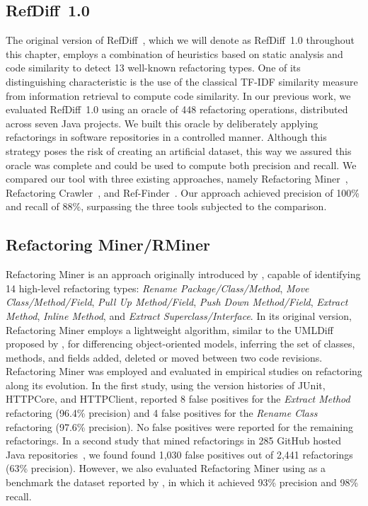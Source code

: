 \subsection{RefDiff~1.0}

The original version of RefDiff~\citep{msr2017}, which we will denote as RefDiff~1.0 throughout this chapter, employs a combination of heuristics based on static analysis and code similarity to detect 13 well-known refactoring types.
One of its distinguishing characteristic is the use of the classical TF-IDF similarity measure from information retrieval to compute code similarity.
In our previous work, we evaluated RefDiff~1.0 using an oracle of 448 refactoring operations, distributed across seven Java projects.
We built this oracle by deliberately applying refactorings in software repositories in a controlled manner.
Although this strategy poses the risk of creating an artificial dataset, this way we assured this oracle was complete and could be used to compute both precision and recall.
We compared our tool with three existing approaches, namely Refactoring Miner~\citep{tsantalis_empiricalstudy}, Refactoring Crawler~\citep{dig2006automated}, and Ref-Finder~\citep{Kim:2010:RefFinder}.
Our approach achieved precision of 100\% and recall of 88\%, surpassing the three tools subjected to the comparison.


\subsection{Refactoring Miner/RMiner}

Refactoring Miner is an approach originally introduced by \cite{tsantalis_empiricalstudy}, capable of identifying 14 high-level refactoring types: \emph{Rename Package/Class/Method}, \emph{Move Class/Method/Field}, \emph{Pull Up Method/Field}, \emph{Push Down Method/Field}, \emph{Extract Method}, \emph{Inline Method}, and \emph{Extract Superclass/Interface}.
In its original version, Refactoring Miner employs a lightweight algorithm, similar to the UMLDiff proposed by \cite{Xing:2005}, for differencing object-oriented models, inferring the set of classes, methods, and fields added, deleted or moved between two code revisions. 
Refactoring Miner was employed and evaluated in empirical studies on refactoring along its evolution.
In the first study, using the version histories of JUnit, HTTPCore, and HTTPClient, \cite{tsantalis_empiricalstudy} reported 8 false positives for the \emph{Extract Method} refactoring (96.4\% precision) and 4 false positives for the \emph{Rename Class} refactoring (97.6\% precision). No false positives were reported for the remaining refactorings.
In a second study that mined refactorings in 285 GitHub hosted Java repositories~\citep{fse2016-why-we-refactor}, we found found 1,030 false positives out of 2,441 refactorings (63\% precision). However, we also evaluated Refactoring Miner using as a benchmark the dataset reported by \cite{Chaparro:2014}, in which it achieved 93\% precision and 98\% recall.

